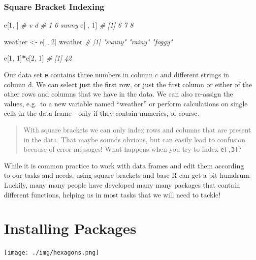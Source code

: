 \documentclass[
]{book}
\newenvironment{Shaded}{\begin{snugshade}}{\end{snugshade}}
\newcommand{\CommentTok}[1]{\textcolor[rgb]{0.56,0.35,0.01}{\textit{#1}}}
\newcommand{\DecValTok}[1]{\textcolor[rgb]{0.00,0.00,0.81}{#1}}
\newcommand{\NormalTok}[1]{#1}
\newcommand{\OtherTok}[1]{\textcolor[rgb]{0.56,0.35,0.01}{#1}}
\newcommand{\SpecialCharTok}[1]{\textcolor[rgb]{0.81,0.36,0.00}{\textbf{#1}}}
\begin{document}
\subsubsection*{Square Bracket Indexing}\label{square-bracket-indexing}

\begin{Shaded}
\begin{Highlighting}[]
\NormalTok{e[}\DecValTok{1}\NormalTok{, ]}
\CommentTok{\#   v     d}
\CommentTok{\# 1 6 sunny}
\NormalTok{e[ , }\DecValTok{1}\NormalTok{]}
\CommentTok{\# [1] 6 7 8}

\NormalTok{weather }\OtherTok{\textless{}{-}}\NormalTok{ e[ , }\DecValTok{2}\NormalTok{]}
\NormalTok{weather}
\CommentTok{\# [1] "sunny" "rainy" "foggy"}

\NormalTok{e[}\DecValTok{1}\NormalTok{, }\DecValTok{1}\NormalTok{]}\SpecialCharTok{*}\NormalTok{e[}\DecValTok{2}\NormalTok{, }\DecValTok{1}\NormalTok{]}
\CommentTok{\# [1] 42}
\end{Highlighting}
\end{Shaded}

Our data set \texttt{e} contains three numbers in column c and different strings in column d.
We can select just the first row, or just the first column or either of the other rows and columns that we have in the data.
We can also re-assign the values, e.g.~to a new variable named ``weather'' or perform calculations on single cells in the data frame - only if they contain numerics, of course.

\begin{quote}
With square brackets we can only index rows and columns that are present in the data.
That maybe sounds obvious, but can easily lead to confusion because of error messages!
What happens when you try to index \texttt{e{[},3{]}}?
\end{quote}

While it is common practice to work with data frames and edit them according to our tasks and needs, using square brackets and base R can get a bit humdrum.
Luckily, many many people have developed many many packages that contain different functions, helping us in most tasks that we will need to tackle!

\section{Installing Packages}\label{installing-packages}

\texttt{[image: ./img/hexagons.png]}
\end{document}
